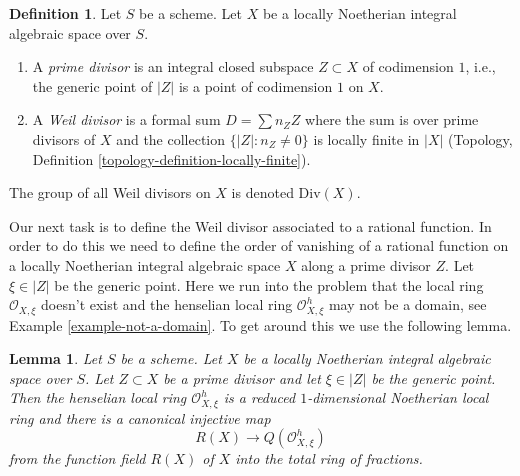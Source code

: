 \documentclass{stacks-project}
\theoremstyle{plain}
\newtheorem{lemma}[subsection]{Lemma}
\theoremstyle{definition}
\newtheorem{definition}[subsection]{Definition}
\theoremstyle{remark}
\numberwithin{equation}{subsection}
\begin{document}
\begin{definition}
\label{definition-Weil-divisor}
Let $S$ be a scheme.
Let $X$ be a locally Noetherian integral algebraic space over $S$.
\begin{enumerate}
\item A {\it prime divisor} is an integral closed subspace $Z \subset X$
of codimension $1$, i.e., the generic point of $|Z|$ is a point
of codimension $1$ on $X$.
\item A {\it Weil divisor} is a formal sum $D = \sum n_Z Z$ where
the sum is over prime divisors of $X$ and the collection
$\{|Z| : n_Z \not = 0\}$ is locally finite in $|X|$
(Topology, Definition \ref{topology-definition-locally-finite}).
\end{enumerate}
The group of all Weil divisors on $X$ is denoted $\text{Div}(X)$.
\end{definition}

\noindent
Our next task is to define the Weil divisor associated to a rational
function. In order to do this we need to define the order of vanishing of a
rational function on a locally Noetherian integral algebraic space $X$
along a prime divisor $Z$. Let $\xi \in |Z|$ be the generic point.
Here we run into the problem that the local ring $\mathcal{O}_{X, \xi}$
doesn't exist and the henselian local ring $\mathcal{O}_{X, \xi}^h$
may not be a domain, see Example \ref{example-not-a-domain}.
To get around this we use the following lemma.

\begin{lemma}
\label{lemma-order-vanishing}
Let $S$ be a scheme. Let $X$ be a locally Noetherian integral algebraic space
over $S$. Let $Z \subset X$ be a prime divisor and let $\xi \in |Z|$ be
the generic point. Then the henselian local ring $\mathcal{O}_{X, \xi}^h$
is a reduced $1$-dimensional Noetherian local ring and
there is a canonical injective map
$$
R(X) \longrightarrow Q(\mathcal{O}_{X, \xi}^h)
$$
from the function field $R(X)$ of $X$ into the total ring of fractions.
\end{lemma}
\end{document}
